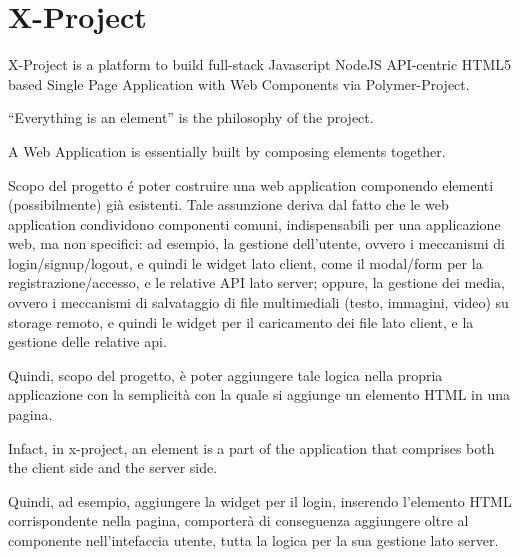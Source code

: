 \section{X-Project}
\label{sec:XPR_xpr}

X-Project is a platform to build full-stack Javascript NodeJS API-centric HTML5 based Single Page Application with Web Components via Polymer-Project.

``Everything is an element'' is the philosophy of the project.

A Web Application is essentially built by composing elements together.

Scopo del progetto é poter costruire una web application componendo elementi (possibilmente) già esistenti.
Tale assunzione deriva dal fatto che le web application condividono componenti comuni, indispensabili per una applicazione web, ma non specifici: ad esempio, la gestione dell'utente, ovvero i meccanismi di login/signup/logout, e quindi le widget lato client, come il modal/form per la registrazione/accesso, e le relative API lato server; oppure, la gestione dei media, ovvero i meccanismi di salvataggio di file multimediali (testo, immagini, video) su storage remoto, e quindi le widget per il caricamento dei file lato client, e la gestione delle relative api.

Quindi, scopo del progetto, è poter aggiungere tale logica nella propria applicazione con la semplicità con la quale si aggiunge un elemento HTML in una pagina.

Infact, in x-project, an element is a part of the application that comprises both the client side and the server side.

Quindi, ad esempio, aggiungere la widget per il login, inserendo l'elemento HTML corrispondente nella pagina, comporterà di conseguenza aggiungere oltre al componente nell'intefaccia utente, tutta la logica per la sua gestione lato server.

 

